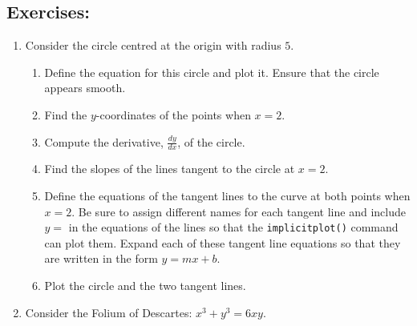 \subsection*{Exercises:}
\begin{enumerate}
    \item  Consider the circle centred at the origin with radius $5$. 
    \label{Mathematical function!Circle}
    \begin{enumerate}
    	\item Define the equation for this circle and plot it. Ensure that the circle appears smooth.
    	\item Find the $y$-coordinates of the points when $x=2$.
    	\item Compute the derivative, $\frac{dy}{dx}$, of the circle.
    	\item Find the slopes of the lines tangent to the circle at $x=2$.
    	\item Define the equations of the tangent lines to the curve at both points when $x=2$. Be sure to assign different names for each tangent line and include $y=$ in the equations of the lines so that the \texttt{implicitplot()} command can plot them. Expand each of these tangent line equations so that they are written in the form $y=mx+b$.
    	\item Plot the circle and the two tangent lines.
    \end{enumerate}
    
    \item Consider the Folium of Descartes: $x^3 + y^3 = 6xy.$


\end{enumerate}
